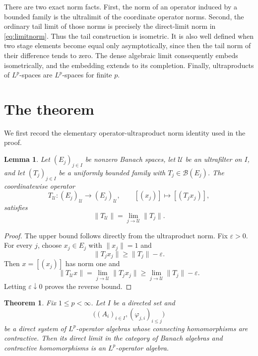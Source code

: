 \documentclass[11pt]{article}
\newtheorem{theorem}{Theorem}
\newtheorem{lemma}{Lemma}
\newcommand{\B}{\mathcal B}
\newcommand{\U}{\mathcal U}
\begin{document}
There are two exact norm facts.  First, the norm of an operator induced by a
bounded family is the ultralimit of the coordinate operator norms.  Second,
the ordinary tail limit of those norms is precisely the direct-limit norm in
\eqref{eq:limitnorm}.  Thus the tail construction is isometric.  It is also
well defined when two stage elements become equal only asymptotically, since
then the tail norm of their difference tends to zero.  The dense algebraic
limit consequently embeds isometrically, and the embedding extends to its
completion.  Finally, ultraproducts of $L^p$-spaces are $L^p$-spaces for finite
$p$.

\section{The theorem}

We first record the elementary operator-ultraproduct norm identity used in the
proof.

\begin{lemma}\label{lem:operatornorm}
Let $(E_j)_{j\in I}$ be nonzero Banach spaces, let $\U$ be an ultrafilter on $I$, and
let $(T_j)_{j\in I}$ be a uniformly bounded family with
$T_j\in\B(E_j)$.  The coordinatewise operator
\[
 T_\U:(E_j)_\U\longrightarrow(E_j)_\U,
 \qquad [(x_j)]\longmapsto[(T_jx_j)],
\]
satisfies
\[
 \|T_\U\|=\lim_{j\to\U}\|T_j\|.
\]
\end{lemma}

\begin{proof}
The upper bound follows directly from the ultraproduct norm.  Fix
$\varepsilon>0$.  For every $j$, choose $x_j\in E_j$ with $\|x_j\|=1$ and
\[
 \|T_jx_j\|\ge \|T_j\|-\varepsilon.
\]
Then $x=[(x_j)]$ has norm one and
\[
 \|T_\U x\|=\lim_{j\to\U}\|T_jx_j\|
 \ge\lim_{j\to\U}\|T_j\|-\varepsilon.
\]
Letting $\varepsilon\downarrow0$ proves the reverse bound.
\end{proof}

\begin{theorem}\label{thm:main}
Fix $1\le p<\infty$.  Let $I$ be a directed set and
\[
 \big((A_i)_{i\in I},(\varphi_{j,i})_{i\le j}\big)
\]
be a direct system of $L^p$-operator algebras whose connecting homomorphisms
are contractive.  Then its direct limit in the category of Banach algebras and
contractive homomorphisms is an $L^p$-operator algebra.
\end{theorem}
\end{document}
